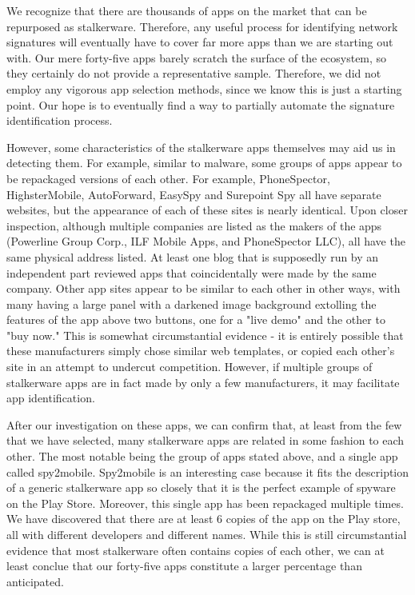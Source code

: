 \documentclass[acmtog]{acmart}
\begin{document}
We recognize that there are thousands of apps on the market that can be 
repurposed as stalkerware. Therefore, any useful process for identifying 
network signatures will eventually have to cover far more apps than we are 
starting out with. Our mere forty-five apps barely scratch the surface of the 
ecosystem, so they certainly do not provide a representative sample. Therefore, 
we did not employ any vigorous app selection methods, since we know this is 
just a starting point. Our hope is to eventually find a way to partially 
automate the signature identification process.

However, some characteristics of the stalkerware apps themselves may aid us in 
detecting them. For example, similar to malware, some groups of apps appear to 
be repackaged versions of each other. For example, PhoneSpector, 
HighsterMobile, AutoForward, EasySpy and Surepoint Spy all have separate 
websites, but the appearance of each of these sites is nearly identical. Upon 
closer inspection, although multiple companies are listed as the makers of the 
apps (Powerline Group Corp., ILF Mobile Apps, and PhoneSpector LLC), all have 
the same physical address listed. At least one blog that is supposedly run by 
an independent part reviewed apps that coincidentally were made by the same 
company\cite{noauthor_best_nodate}. Other app sites appear to be similar to each other in other ways, 
with many having a large panel with a darkened image background extolling the 
features of the app above two buttons, one for a "live demo" and the other to 
"buy now." This is somewhat circumstantial evidence - it is entirely possible 
that these manufacturers simply chose similar web templates, or copied each 
other's site in an attempt to undercut competition. However, if multiple groups 
of stalkerware apps are in fact made by only a few manufacturers, it may 
facilitate app identification. 

After our investigation on these apps, we can confirm that, at least from the few that we have selected, many stalkerware apps are related in some fashion to each other. The most notable being the group of apps stated above, and a single app called spy2mobile. Spy2mobile is an interesting case because it fits the description of a generic stalkerware app so closely that it is the perfect example of spyware on the Play Store. Moreover, this single app has been repackaged multiple times. We have discovered that there are at least 6 copies of the app on the Play store, all with different developers and different names. While this is still circumstantial evidence that most stalkerware often contains copies of each other, we can at least conclue that our forty-five apps constitute a larger percentage than anticipated.
\end{document}
